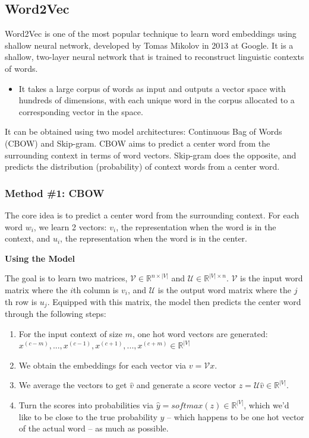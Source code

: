 \documentclass[
]{book}
\providecommand{\tightlist}{%
  \setlength{\itemsep}{0pt}\setlength{\parskip}{0pt}}
\begin{document}
\hypertarget{word2vec}{%
\subsection{Word2Vec}\label{word2vec}}

Word2Vec is one of the most popular technique to learn word embeddings using shallow neural network, developed by Tomas Mikolov in 2013 at Google. It is a shallow, two-layer neural network that is trained to reconstruct linguistic contexts of words.

\begin{itemize}
\tightlist
\item
  It takes a large corpus of words as input and outputs a vector space with hundreds of dimensions, with each unique word in the corpus allocated to a corresponding vector in the space.
\end{itemize}

It can be obtained using two model architectures: Continuous Bag of Words (CBOW) and Skip-gram. CBOW aims to predict a center word from the surrounding context in terms of word vectors. Skip-gram does the opposite, and predicts the distribution (probability) of context words from a center word.

\hypertarget{method-1-cbow}{%
\subsubsection{Method \#1: CBOW}\label{method-1-cbow}}

The core idea is to predict a center word from the surrounding context. For each word \(w_i\), we learn 2 vectors: \(v_i\), the representation when the word is in the context, and \(u_i\), the representation when the word is in the center.

\textbf{Using the Model }

The goal is to learn two matrices, \(\mathcal{V}\in\mathbb{R}^{n\times|V|}\) and \(\mathcal{U}\in\mathbb{R}^{|V|\times n}\). \(\mathcal{V}\) is the input word matrix where the \(i\)th column is \(v_i\), and \(\mathcal{U}\) is the output word matrix where the \(j\)th row is \(u_j\). Equipped with this matrix, the model then predicts the center word through the following steps:

\begin{enumerate}
\def\labelenumi{\arabic{enumi}.}
\tightlist
\item
  For the input context of size \(m\), one hot word vectors are generated: \(x^{(c-m)}, ..., x^{(c-1)},x^{(c+1)},...,x^{(c+m)}\in\mathbb{R}^{|V|}\)
\item
  We obtain the embeddings for each vector via \(v = \mathcal{V}x\).
\item
  We average the vectors to get \(\hat{v}\) and generate a score vector \(z=\mathcal{U}\hat{v}\in\mathbb{R}^{|V|}\).
\item
  Turn the scores into probabilities via \(\hat{y} = softmax(z) \in\mathbb{R}^{|V|}\), which we'd like to be close to the true probability \(y\) -- which happens to be one hot vector of the actual word -- as much as possible.
\end{enumerate}
\end{document}
